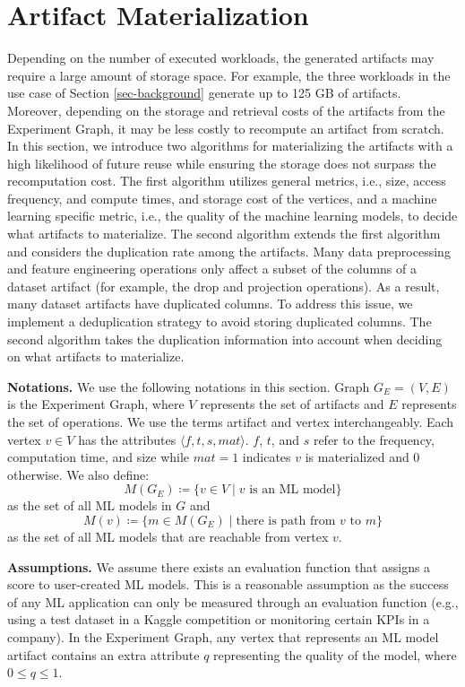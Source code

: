 \section{Artifact Materialization}\label{sec-materialization}
Depending on the number of executed workloads, the generated artifacts may require a large amount of storage space.
For example, the three workloads in the use case of Section \ref{sec-background} generate up to 125 GB of artifacts.
Moreover, depending on the storage and retrieval costs of the artifacts from the Experiment Graph, it may be less costly to recompute an artifact from scratch.
In this section, we introduce two algorithms for materializing the artifacts with a high likelihood of future reuse while ensuring the storage does not surpass the recomputation cost.
The first algorithm utilizes general metrics, i.e., size, access frequency, and compute times, and storage cost of the vertices, and a machine learning specific metric, i.e., the quality of the machine learning models, to decide what artifacts to materialize.
The second algorithm extends the first algorithm and considers the duplication rate among the artifacts.
Many data preprocessing and feature engineering operations only affect a subset of the columns of a dataset artifact (for example, the drop and projection operations).
As a result, many dataset artifacts have duplicated columns.
To address this issue, we implement a deduplication strategy to avoid storing duplicated columns.
The second algorithm takes the duplication information into account when deciding on what artifacts to materialize.

\textbf{Notations. }
We use the following notations in this section.
Graph $G_E = (V,E)$ is the Experiment Graph, where $V$ represents the set of artifacts and $E$ represents the set of operations.
We use the terms artifact and vertex interchangeably.
Each vertex $v \in V$ has the attributes $\langle f, t, s, mat \rangle$.
$f$, $t$, and $s$ refer to the frequency, computation time, and size while $mat=1$ indicates $v$ is materialized and $0$ otherwise.
We also define:
\[M(G_E) \coloneqq  \{v \in V \mid v \text{ is an ML model}\}\] as the set of all ML models in $G$ and 
\[M(v) \coloneqq  \{m \in M(G_E) \mid\text{there is path from } v \text{ to } m\}\] as the set of all ML models that are reachable from vertex $v$.

\textbf{Assumptions. }
We assume there exists an evaluation function that assigns a score to user-created ML models.
This is a reasonable assumption as the success of any ML application can only be measured through an evaluation function (e.g., using a test dataset in a Kaggle competition or monitoring certain KPIs in a company).
In the Experiment Graph, any vertex that represents an ML model artifact contains an extra attribute $q$ representing the quality of the model, where $0 \leq q \leq 1$.

